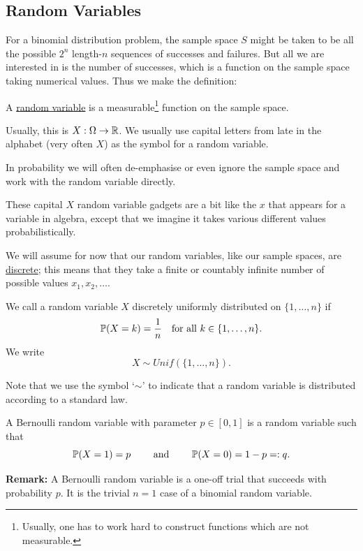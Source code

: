 \subsection{Random Variables}

For a binomial distribution problem, the sample space $S$ might be taken to be all the possible $2^n$ length-$n$ sequences of successes and failures. But all we are interested in is the number of successes, which is a function on the sample space taking numerical values.  Thus we make the definition:

\begin{defn}
A \ul{random variable} is a measurable\footnote{Usually, one has to work hard to construct functions which are not measurable.} function on the sample space.
\end{defn}
Usually, this is $X:\Omega\to {\mathbb R}$. We usually use capital letters from late in the alphabet (very often $X$) as the symbol for a random variable. 

In probability we will often de-emphasise or even ignore the sample space and work with the random variable directly. 

These capital $X$ random variable gadgets are a bit like the $x$ that appears for a variable in algebra, except that we imagine it takes various different values probabilistically. 

We will assume for now that our random variables, like our sample spaces, are \ul{discrete}; this means that they take a finite or countably infinite number of possible values $x_1, x_2, \dots$.  

\begin{defn}
We call a random variable $X$ discretely uniformly distributed on $\{ 1, \ldots, n \}$ if
$$ {\mathbb P}( X =k) = \frac1n \quad \text{for all } k \in \{1,\ldots, n \}.$$
We write
\[X \sim Unif(\{1,\ldots, n\}).\]
\end{defn} 
\noindent Note that we use the symbol `$\sim$' to indicate that a random variable is distributed according to a standard law. 

\begin{defn}
A Bernoulli random variable with parameter $p \in [0,1]$ is a random variable such that
\[ {\mathbb P}(X=1)=p \qquad \text{ and } \qquad {\mathbb P}(X=0)=1-p=:q. \] 
\end{defn}
\noindent \textbf{Remark:} A Bernoulli random variable is a one-off trial that succeeds with probability $p$.  It is the trivial $n=1$ case of a binomial random variable.

